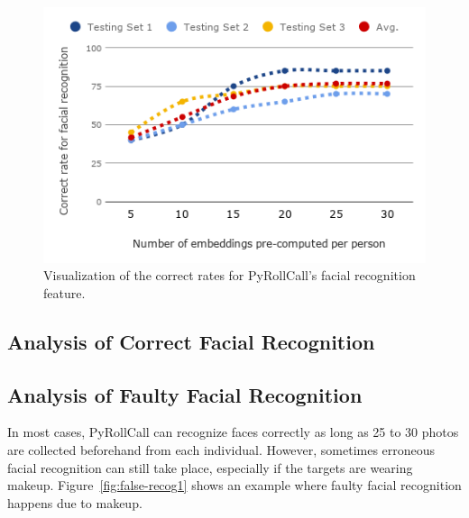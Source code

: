 \begin{figure}[!htb]
  \centering
  \includegraphics[width=0.8\linewidth]{figures/exp-result-chart.png}
  \caption{Visualization of the correct rates for PyRollCall's facial recognition feature.}
  \label{fig:exp-result-chart}
\end{figure}
\clearpage


\subsection{Analysis of Correct Facial Recognition}


\subsection{Analysis of Faulty Facial Recognition}
In most cases, PyRollCall can recognize faces correctly as long as 25 to 30 photos are collected
beforehand from each individual. However, sometimes erroneous facial recognition can still take place,
especially if the targets are wearing makeup. Figure~\ref{fig:false-recog1} shows an example where
faulty facial recognition happens due to makeup.
\vspace{0.2cm}

